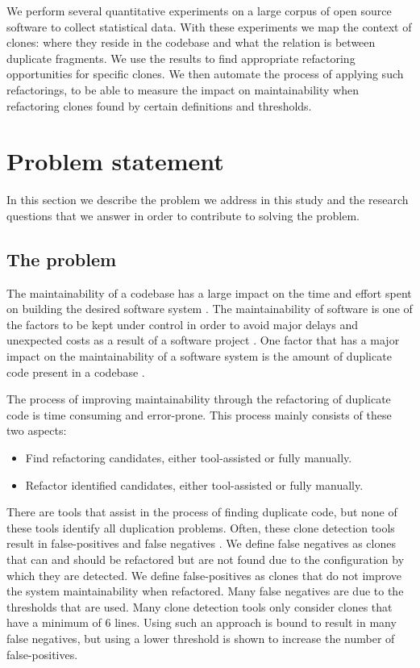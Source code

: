 We perform several quantitative experiments on a large corpus of open source software to collect statistical data. With these experiments we map the context of clones: where they reside in the codebase and what the relation is between duplicate fragments. We use the results to find appropriate refactoring opportunities for specific clones. We then automate the process of applying such refactorings, to be able to measure the impact on maintainability when refactoring clones found by certain definitions and thresholds.

\section{Problem statement}
In this section we describe the problem we address in this study and the research questions that we answer in order to contribute to solving the problem.

\subsection{The problem}
The maintainability of a codebase has a large impact on the time and effort spent on building the desired software system \cite{bakota2012cost, munson1978software}. The maintainability of software is one of the factors to be kept under control in order to avoid major delays and unexpected costs as a result of a software project \cite{fowler2018refactoring}. One factor that has a major impact on the maintainability of a software system is the amount of duplicate code present in a codebase \cite{heitlager2007practical, fowler1999refactoring}.

The process of improving maintainability through the refactoring of duplicate code is time consuming and error-prone. This process mainly consists of these two aspects:
\begin{itemize}
	\item Find refactoring candidates, either tool-assisted or fully manually. %
	\item Refactor identified candidates, either tool-assisted or fully manually.
\end{itemize}
There are tools that assist in the process of finding duplicate code, but none of these tools identify all duplication problems. Often, these clone detection tools result in false-positives and false negatives \cite{roy2007survey}. We define false negatives as clones that can and should be refactored but are not found due to the configuration by which they are detected. We define false-positives as clones that do not improve the system maintainability when refactored. Many false negatives are due to the thresholds that are used. Many clone detection tools \cite{sajnani2016sourcerercc, svajlenko2016bigcloneeval} only consider clones that have a minimum of 6 lines. Using such an approach is bound to result in many false negatives, but using a lower threshold is shown to increase the number of false-positives. %

